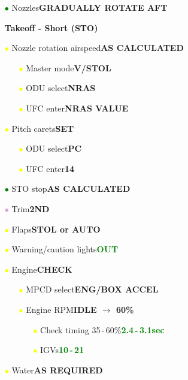 \documentclass[a4paper,12pt,dvipsnames]{letter}
\newcommand{\button}[1]{\textbf{#1}}
\newcommand{\Deg}{\textdegree{}}
\newcommand{\ok}[1]{\textcolor{Green}{\textbf{#1}}}
\newcommand{\gi}{\textcolor{Green}{$\bullet$\;}}
\newcommand{\yi}{\textcolor{Yellow}{$\bullet$\;}}
\newcommand{\vi}{\textcolor{Plum}{$\bullet$\;}}
\begin{document}
{\begin{itemize}
\begin{itemize}
\item[\gi] Nozzles\dotfill\button{GRADUALLY ROTATE AFT}
\end{itemize}
\end{itemize}
\newpage
\begin{itemize}
\item[] {\LARGE\textbf{Takeoff - Short (STO)}}
\item[\yi] Nozzle rotation airspeed\dotfill\button{AS CALCULATED}
\begin{itemize}
 \item[\yi] Master mode\dotfill\button{V/STOL}
 \item[\yi] ODU select\dotfill\button{NRAS}
 \item[\yi] UFC enter\dotfill\button{NRAS VALUE}
\end{itemize}
\item[\yi] Pitch carets\dotfill\button{SET}
\begin{itemize}
 \item[\yi] ODU select\dotfill\button{PC}
 \item[\yi] UFC enter\dotfill\button{14}
\end{itemize}
\item[\gi] STO stop\dotfill\button{AS CALCULATED}
\item[\vi] Trim\dotfill\button{2\Deg\;ND}
\item[\yi] Flaps\dotfill\button{STOL or AUTO}
\item[\yi] Warning/caution lights\dotfill\ok{OUT}
\item[\yi] Engine\dotfill\button{CHECK}
\begin{itemize}
 \item[\yi] MPCD select\dotfill\button{ENG/BOX ACCEL}
 \item[\yi] Engine RPM\dotfill\button{IDLE $\rightarrow$ 60\%}
 \begin{itemize}
  \item[\yi] Check timing 35\,-\,60\%\dotfill\ok{2.4\,-\,3.1\;sec}
  \item[\yi] IGVs\dotfill\ok{10\Deg\,-\,21\Deg}	
 \end{itemize}
\end{itemize}
\item[\yi] Water\dotfill\button{AS REQUIRED}

\end{itemize}}
\end{document}
